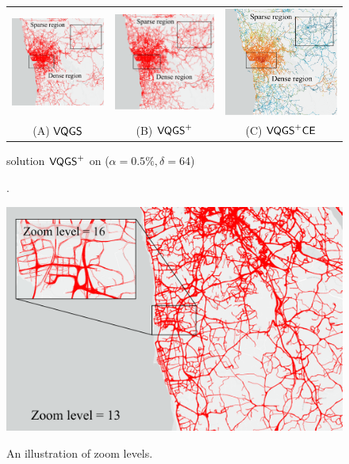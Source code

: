 \begin{figure}
   \begin{minipage}{0.65\textwidth}
     \centering
     \begin{tabular}{ccc}
     \includegraphics[width=0.22\linewidth]{pictures/motivation_VQGS}
     &
     \includegraphics[width=0.22\linewidth]{pictures/motivation_VQGS+d64}
     &
     \includegraphics[width=0.22\linewidth]{pictures/motivation_VQGS+d64CE}
     \\
     (A) $\mathsf{VQGS}$
     &
     (B) $\mathsf{VQGS}^+$
     &
     (C) $\mathsf{VQGS}^+\mathsf{CE}$
     \end{tabular}
     \trim
     \caption{\prob{} solution $\mathsf{VQGS}^+$ on \pt{} ($\alpha = 0.5\%, \delta = 64$)}\label{fig:delta}.
   \end{minipage}\hfill
   \begin{minipage}{0.35\textwidth}
     \centering
     \includegraphics[width=0.73\linewidth]{pictures/zoomlevel.pdf}
     \label{Fig:zoom}
     \trim
     \caption{An illustration of zoom levels.}
   \end{minipage}
   \trim
\end{figure}


